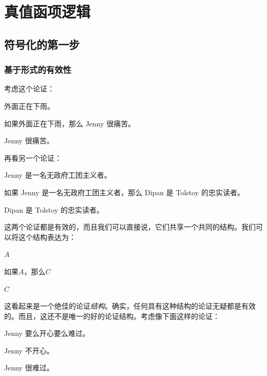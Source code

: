 \part{真值函项逻辑}
\label{ch.TFL}

\chapter{符号化的第一步}

\section{基于形式的有效性}\label{s:ValidityInVirtueOfForm}
考虑这个论证：


\begin{earg}
		\item[] 外面正在下雨。
		\item[] 如果外面正在下雨，那么 Jenny 很痛苦。
		\item[\texttherefore] Jenny 很痛苦。
	\end{earg}


再看另一个论证：


\begin{earg}
		\item[] Jenny 是一名无政府工团主义者。
		\item[] 如果 Jenny 是一名无政府工团主义者，那么 Dipan 是 Tolstoy 的忠实读者。
		\item[\texttherefore] Dipan 是 Tolstoy 的忠实读者。
	\end{earg}


这两个论证都是有效的，而且我们可以直接说，它们共享一个共同的结构。我们可以将这个结构表达为：


\begin{earg}
		\item[] $A$
		\item[] 如果$A$，那么$C$
		\item[\texttherefore] $C$
	\end{earg}


这看起来是一个绝佳的论证\emph{结构}。确实，任何具有这种结构的论证无疑都是有效的。而且，这还不是唯一的好的论证结构。考虑像下面这样的论证：


\begin{earg}
		\item[] Jenny 要么开心要么难过。
		\item[] Jenny 不开心。
		\item[\texttherefore] Jenny 很难过。
	\end{earg}


